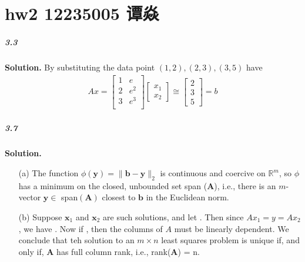 \documentclass[a4paper]{book}
\newenvironment{solution}%
{\noindent\textbf{Solution.}}%
{\qedhere}
\numberwithin{equation}{chapter}
\theoremstyle{definition}
\begin{document}


\pagestyle{fancy}

\setcounter{chapter}{1}
\chapter{hw2 12235005 谭焱}

\paragraph*{3.3 }
\begin{solution}
    By  substituting the data point $(1, 2), (2, 3), (3, 5)$ have 
    \begin{align*}
        Ax = \left[
            \begin{array}{cc}
            1 & e \\
            2 & e^2 \\
            3 & e^3 \\
        \end{array}
        \right]
        \left[\begin{array}{c}
            x_1 \\
            x_2 
        \end{array}\right]
        \cong \left[ \begin{array}{c}
            2 \\
            3 \\
            5
        \end{array} \right] = b
    \end{align*}
\end{solution}

\paragraph*{3.7 }
\begin{solution}
    \begin{itemize}
        \item [(a)] The function $\phi(\bm y) = \| \bm b - 
        \bm y \|_2$ is continuous and coercive on $\mathbb{R}^m$,
        so $\phi$ has a minimum on the closed, unbounded set span
        ($\bm A$), i.e., there is an $m$-vector $\bm y \in $ span$ 
        (\bm A)$ closest to $\bm b$ in the Euclidean norm. 

        \item [(b)] Suppose $\bm x_1$ and $\bm x_2$ are such 
        solutions, and let . Then since \bm 
        {$Ax_1 = y = Ax_2$}, we have . Now if 
        , then the 
        columns of \bm$A$ must be linearly dependent. We conclude
        that teh solution to an $m \times n$ least squares problem 
         is  unique if, and only if, $\bm A$ has 
        full column rank, i.e., rank($\bm A$) = n.
    \end{itemize}
\end{solution}
\end{document}
